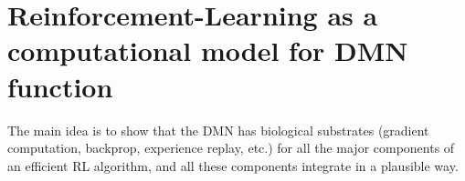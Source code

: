 \documentclass{article} %
\DeclareMathOperator{\argmax}{argmax}
\begin{document}




\section{Reinforcement-Learning as a computational model for DMN function}
The main idea is to show that the DMN has biological substrates (gradient
computation, backprop, experience replay, etc.) for all the
major components of an efficient RL algorithm, and all these components
integrate in a plausible way.
\end{document}
